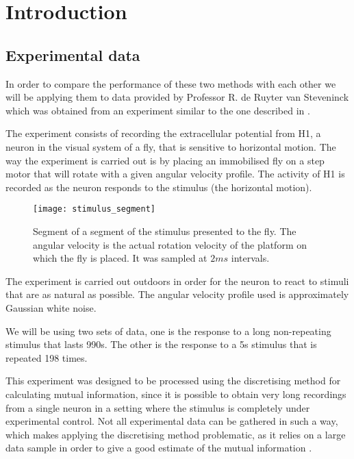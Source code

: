 \documentclass[10pt,a4paper]{book}
\begin{document}
\chapter{Introduction}



\section{Experimental data}%

In order to compare the performance of these two methods with each other we will be applying them to data provided by Professor R. de Ruyter van Steveninck which was obtained from an experiment similar to the one described in \cite{Nemenman08}.

The experiment consists of recording the extracellular potential from H1, a neuron in the visual system of a fly, that is sensitive to horizontal motion. The way the experiment is carried out is by placing an immobilised fly on a step motor that will rotate with a given angular velocity profile. The activity of H1 is recorded as the neuron responds to the stimulus (the horizontal motion).


\begin{figure}[h!]
\begin{center}
\texttt{[image: stimulus\_segment]}
\caption{Segment of a segment of the stimulus presented to the fly. The angular velocity is the actual rotation velocity of the platform on which the fly is placed. It was sampled at $2ms$ intervals.}
\end{center}
\end{figure}

The experiment is carried out outdoors in order for the neuron to react to stimuli that are as natural as possible. The angular velocity profile used is approximately Gaussian white noise.

We will be using two sets of data, one is the response to a long non-repeating stimulus that lasts 990s. The other is the response to a 5s stimulus that is repeated 198 times.

This experiment was designed to be processed using the discretising method for calculating mutual information, since it is possible to obtain very long recordings from a single neuron in a setting where the stimulus is completely under experimental control. Not all experimental data can be gathered in such a way, which makes applying the discretising method problematic, as it relies on a large data sample in order to give a good estimate of the mutual information \cite{some_bialek_paper}.
\end{document}
